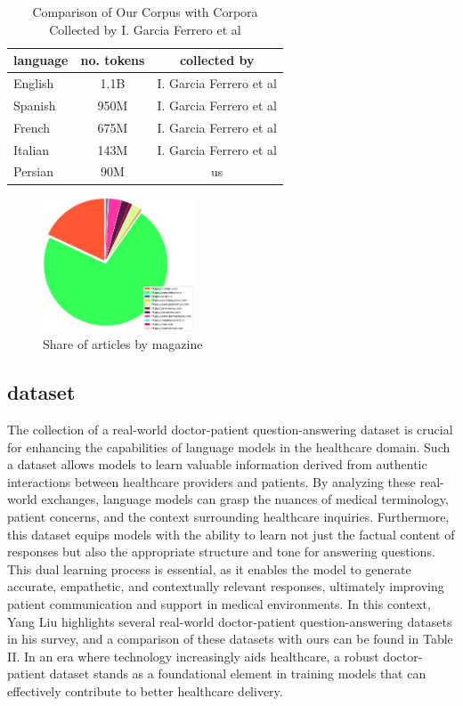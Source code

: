 \documentclass[conference]{IEEEtran}
\begin{document}
\begin{table}[ht]
	\centering
	\caption{Comparison of Our Corpus with Corpora Collected by I. Garcia Ferrero et al}
	\begin{tabular}{|l|c|c|}  %
		\hline
		language& no. tokens & collected by \\ \hline
		English & 1.1B & I. Garcia Ferrero et al \\ \hline
		Spanish & 950M & I. Garcia Ferrero et al  \\ \hline
		French & 675M & I. Garcia Ferrero et al  \\ \hline
		Italian& 143M &  I. Garcia Ferrero et al  \\ \hline
		Persian& 90M & us	\\ \hline
	\end{tabular}
	\label{tab:model_results_on_mcqa}
\end{table}

\begin{figure}[htbp]
	\centerline{\includegraphics[width=0.4\textwidth]{fig1.png}}
	\caption{Share of articles by magazine}
	\label{fig1}
\end{figure}

\subsection{dataset}
The collection of a real-world doctor-patient question-answering dataset is crucial for enhancing the capabilities of language models in the healthcare domain. Such a dataset allows models to learn valuable information derived from authentic interactions between healthcare providers and patients. By analyzing these real-world exchanges, language models can grasp the nuances of medical terminology, patient concerns, and the context surrounding healthcare inquiries. Furthermore, this dataset equips models with the ability to learn not just the factual content of responses but also the appropriate structure and tone for answering questions. This dual learning process is essential, as it enables the model to generate accurate, empathetic, and contextually relevant responses, ultimately improving patient communication and support in medical environments. In this context, Yang Liu \cite{b6} highlights several real-world doctor-patient question-answering datasets in his survey, and a comparison of these datasets with ours can be found in Table II. In an era where technology increasingly aids healthcare, a robust doctor-patient dataset stands as a foundational element in training models that can effectively contribute to better healthcare delivery.
\end{document}
